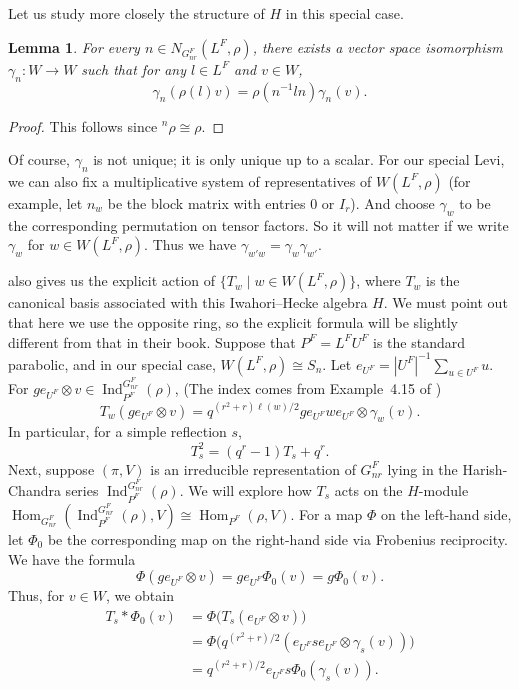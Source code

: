 \documentclass[12pt]{article}
\newtheorem{lemma}[theorem]{Lemma}
\theoremstyle{remark}
\begin{document}
Let us study more closely the structure of $H$ in this special case.
\begin{lemma}
For every $n \in N_{G^F_{nr}}(L^F, \rho)$, there exists a vector space isomorphism $\gamma_n \colon W \to W$ such that for any $l \in L^F$ and $v \in W$,
\[
\gamma_n(\rho(l)v) = \rho(n^{-1}ln) \gamma_n(v).
\]
\end{lemma}
\begin{proof}
This follows since ${}^n\rho \cong \rho$.
\end{proof}
Of course, $\gamma_n$ is not unique; it is only unique up to a scalar. 
For our special Levi, we can also fix a multiplicative system of representatives of $W(L^F,\rho)$ (for example, let $n_w$ be the block matrix with entries $0$ or $I_r$). And choose $\gamma_w$ to be the corresponding permutation on tensor factors. So it will not matter if we write $\gamma_w$ for $w \in W(L^F,\rho)$. Thus we have $\gamma_{w'w}=\gamma_w \gamma_{w'}$.

\cite{HowlettLehrer1980} also gives us the explicit action of $\{ T_w \mid w \in W(L^F,\rho) \}$, where $T_w$ is the canonical basis associated with this Iwahori--Hecke algebra $H$.
We must point out that here we use the opposite ring, so the explicit formula will be slightly different from that in their book.
Suppose that $P^F = L^F U^F$ is the standard parabolic, and in our special case, $W(L^F,\rho) \cong S_n$. Let $e_{U^F} = |U^F|^{-1} \sum_{u \in U^F} u$.
For $g e_{U^F} \otimes v \in \operatorname{Ind}_{P^F}^{G^F_{nr}}(\rho)$, (The index comes from Example~4.15 of \cite{HowlettLehrer1980})
$$
T_w (g e_{U^F} \otimes v) = q^{{(r^2+r)\ell(w)/2} } g e_{U^F} w e_{U^F} \otimes \gamma_w (v).
$$
In particular, for a simple reflection $s$,
$$
T_s^2 = (q^r - 1) T_s + q^r.
$$
Next, suppose $(\pi,V)$ is an irreducible representation of $G_{nr}^F$ lying in the Harish-Chandra series $\operatorname{Ind}_{P^F}^{G_{nr}^F}(\rho)$. We will explore how $T_s$ acts on the $H$-module $\operatorname{Hom}_{G_{nr}^F}(\operatorname{Ind}_{P^F}^{G_{nr}^F}(\rho),V) \cong \operatorname{Hom}_{P^F}(\rho,V)$. For a map $\Phi$ on the left-hand side, let $\Phi_0$ be the corresponding map on the right-hand side via Frobenius reciprocity. We have the formula
$$
\Phi(g e_{U^F} \otimes v) = g e_{U^F} \Phi_0(v)=g\Phi_0(v).
$$
Thus, for $v \in W$, we obtain
\begin{align*}
T_s * \Phi_0(v) &= \Phi\bigl(T_s(e_{U^F} \otimes v)\bigr) \\
&= \Phi\bigl(q^{(r^2+r)/2 }(e_{U^F} s e_{U^F} \otimes \gamma_s(v))\bigr) \\
&= q^{(r^2+r)/2} e_{U^F} s  \Phi_0(\gamma_s(v)).
\end{align*}
\end{document}
